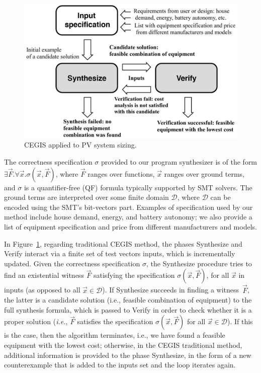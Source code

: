 \documentclass[review]{elsarticle}
\begin{document}
\begin{figure}[h]
	\centering
	\includegraphics[width=0.75\columnwidth]{fig2_rev.jpg}
	\caption{CEGIS applied to PV system sizing.}
	\label{Counter-Example-Guided-Inductive-Synthesis}
\end{figure}

The correctness specification $\sigma$ provided to our program synthesizer is of the form $\exists \vec{F} .  \forall \vec{x}.  \sigma(\vec{x}, \vec{F})$, where $\vec{F}$ ranges over functions, $\vec{x}$ ranges over ground terms, and $\sigma$ is a quantifier-free (QF) formula typically supported by SMT solvers. The ground terms are interpreted over some finite domain $\mathcal{D}$, where $\mathcal{D}$ can be encoded using the SMT's bit-vectors part. Examples of specification used by our method include house demand, energy, and battery autonomy; we also provide a list of equipment specification and price from different manufacturers and models.

In Figure~\ref{Counter-Example-Guided-Inductive-Synthesis}, regarding traditional CEGIS method, the phases {\sc Synthesize} and {\sc Verify} interact via a finite set of test vectors {\sc inputs}, which is incrementally updated. Given the correctness specification $\sigma$, the {\sc Synthesize} procedure tries to find an existential witness $\vec{F}$ satisfying the specification $\sigma(\vec{x}, \vec{F})$, for all $\vec{x}$ in {\sc inputs} (as opposed to all $\vec{x} \in \mathcal{D}$). If {\sc Synthesize} succeeds in finding a witness~$\vec{F}$, the latter is a candidate solution (i.e., feasible combination of equipment) to the full synthesis formula, which is passed to {\sc Verify} in order to check whether it is a proper solution ({\it i.e.}, $\vec{F}$ satisfies the specification $\sigma(\vec{x}, \vec{F})$ for all $\vec{x}\in\mathcal{D}$). If this is the case, then the algorithm terminates, i.e., we have found a feasible equipment with the lowest cost; otherwise, in the CEGIS traditional method, additional information is provided to the phase {\sc Synthesize}, in the form of a new counterexample that is added to the {\sc inputs} set and the loop iterates again.
\end{document}
